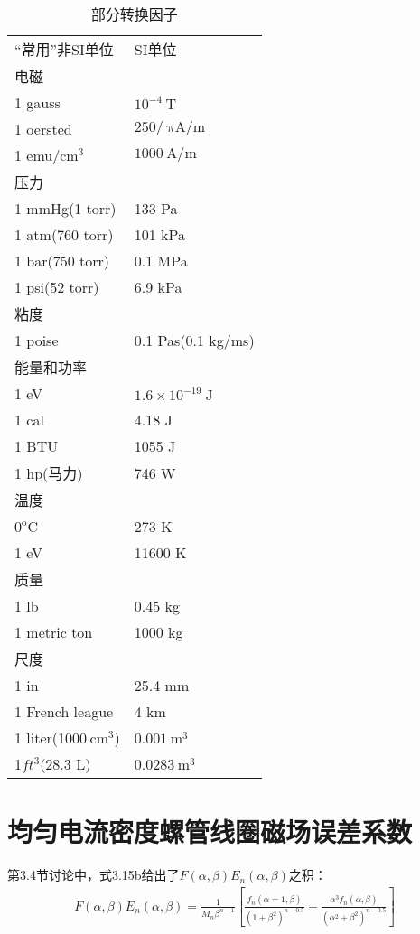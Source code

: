 \begin{table}[htbp]\small
\centering
\caption{部分转换因子}%
\begin{tabular}{ll}
\hline
``常用''非SI单位 & SI单位 \\ 
电磁 & \\ 
1 gauss & $10^{-4}\ \mathrm{T}$ \\ 
1 oersted & $250/\ \mathrm{\pi A/m}$ \\ 
1 emu/$\mathrm{cm^3}$ & $1000\ \mathrm{A/m}$ \\ 
压力& \\ 
1 mmHg(1 torr) & 133 Pa \\ 
1 atm(760 torr) & 101 kPa \\
1 bar(750 torr) & 0.1 MPa \\ 
1 psi(52 torr) & 6.9 kPa \\ 
粘度& \\ 
1 poise & 0.1 Pas(0.1 kg/ms) \\ 
能量和功率 & \\
1 eV & $1.6\times10^{-19}\ \mathrm{J}$ \\ 
1 cal & 4.18 J \\ 
1 BTU & 1055 J \\ 
1 hp(马力) & 746 W \\ 
温度 & \\ 
$0^\mathrm{o}\mathrm{C}$ & 273 K \\ 
1 eV & 11600 K \\ 
质量 & \\ 
1 lb & 0.45 kg \\ 
1 metric ton & 1000 kg \\ 
尺度 & \\ 
1 in & 25.4 mm \\ 
1 French league & 4 km \\ 
1 liter(1000$\ \mathrm{cm^3}$) & $0.001\ \mathrm{m^3}$ \\ 
1$ft^3$(28.3 L) & $0.0283\ \mathrm{m^3}$ \\ 
\end{tabular}
\end{table}
\newpage

\section{均匀电流密度螺管线圈磁场误差系数}
第3.4节讨论中，式3.15b给出了$F(\alpha,\beta) E_{n}(\alpha,\beta)$之积：
\begin{align*}
F(\alpha,\beta) E_{n}(\alpha,\beta)=\frac{1}{M_n \beta^{n-1}}\left[\frac{f_n(\alpha=1,\beta)}{(1+\beta^2)^{n-0.5}}-\frac{\alpha^3 f_n(\alpha,\beta)}{(\alpha^2+\beta^2)^{n-0.5}}\right] \tag{3.15b}
\end{align*}

